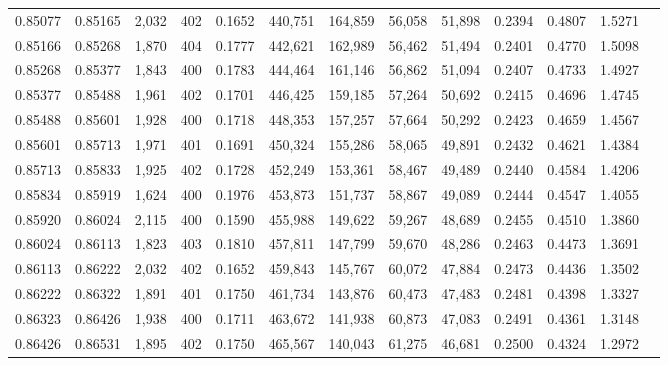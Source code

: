 \begin{tabular}{rrrrrrrrrrrrr}
0.85077 & 0.85165 & 2,032 & 402 &                                     0.1652 & 440,751 & 164,859 &  56,058 &  51,898 & 0.2394 & 0.4807 & 1.5271 \\
0.85166 & 0.85268 & 1,870 & 404 &                                     0.1777 & 442,621 & 162,989 &  56,462 &  51,494 & 0.2401 & 0.4770 & 1.5098 \\
0.85268 & 0.85377 & 1,843 & 400 &                                     0.1783 & 444,464 & 161,146 &  56,862 &  51,094 & 0.2407 & 0.4733 & 1.4927 \\
0.85377 & 0.85488 & 1,961 & 402 &                                     0.1701 & 446,425 & 159,185 &  57,264 &  50,692 & 0.2415 & 0.4696 & 1.4745 \\
0.85488 & 0.85601 & 1,928 & 400 &                                     0.1718 & 448,353 & 157,257 &  57,664 &  50,292 & 0.2423 & 0.4659 & 1.4567 \\
0.85601 & 0.85713 & 1,971 & 401 &                                     0.1691 & 450,324 & 155,286 &  58,065 &  49,891 & 0.2432 & 0.4621 & 1.4384 \\
0.85713 & 0.85833 & 1,925 & 402 &                                     0.1728 & 452,249 & 153,361 &  58,467 &  49,489 & 0.2440 & 0.4584 & 1.4206 \\
0.85834 & 0.85919 & 1,624 & 400 &                                     0.1976 & 453,873 & 151,737 &  58,867 &  49,089 & 0.2444 & 0.4547 & 1.4055 \\
0.85920 & 0.86024 & 2,115 & 400 &                                     0.1590 & 455,988 & 149,622 &  59,267 &  48,689 & 0.2455 & 0.4510 & 1.3860 \\
0.86024 & 0.86113 & 1,823 & 403 &                                     0.1810 & 457,811 & 147,799 &  59,670 &  48,286 & 0.2463 & 0.4473 & 1.3691 \\
0.86113 & 0.86222 & 2,032 & 402 &                                     0.1652 & 459,843 & 145,767 &  60,072 &  47,884 & 0.2473 & 0.4436 & 1.3502 \\
0.86222 & 0.86322 & 1,891 & 401 &                                     0.1750 & 461,734 & 143,876 &  60,473 &  47,483 & 0.2481 & 0.4398 & 1.3327 \\
0.86323 & 0.86426 & 1,938 & 400 &                                     0.1711 & 463,672 & 141,938 &  60,873 &  47,083 & 0.2491 & 0.4361 & 1.3148 \\
0.86426 & 0.86531 & 1,895 & 402 &                                     0.1750 & 465,567 & 140,043 &  61,275 &  46,681 & 0.2500 & 0.4324 & 1.2972 \\

\end{tabular}
